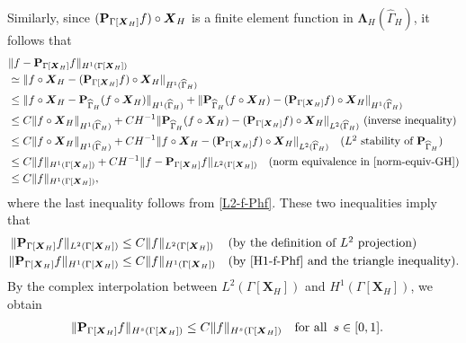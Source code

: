 \documentclass[11pt,reqno]{amsart}
\theoremstyle{definition}
\theoremstyle{plain}
\numberwithin{theorem}{section}
\numberwithin{proposition}{section}
\numberwithin{lemma}{section}
\numberwithin{equation}{section}
\newcommand{\bs}[1]{\boldsymbol{#1}}
\renewcommand{\(}{\bigl(}
\renewcommand{\)}{\bigr)}
\begin{document}
Similarly, since $({\bf P}_{\Gamma[\bs X_H]} f)\circ {\bs X}_H$ is a finite element function in ${\bs\Lambda}_H(\widehat\Gamma_H)$, it follows that 
\begin{align}\label{H1-f-Phf}
&\|f - {\bf P}_{\Gamma[\bs X_H]} f\|_{H^1(\Gamma[\bs X_H])} \notag\\
&\simeq 
\|f\circ{\bs X}_H - ({\bf P}_{\Gamma[\bs X_H]} f)\circ{\bs X}_H\|_{H^1(\widehat\Gamma_H)} \notag\\
&\le \|f \circ{\bs X}_H - {\bf P}_{\widehat\Gamma_H}(f\circ{\bs X}_H)\|_{H^1(\widehat\Gamma_H)} + 
\|{\bf P}_{\widehat\Gamma_H}(f\circ{\bs X}_H) - ({\bf P}_{\Gamma[\bs X_H]} f)\circ{\bs X}_H\|_{H^1(\widehat\Gamma_H)} \notag\\
&\le C\|f \circ{\bs X}_H \|_{H^1(\widehat\Gamma_H)} + CH^{-1}\|{\bf P}_{\widehat\Gamma_H}(f \circ{\bs X}_H) - ({\bf P}_{\Gamma[\bs X_H]} f)\circ {\bs X}_H\|_{L^2(\widehat\Gamma_H)} \,\,\mbox{(inverse inequality)}\notag\\
&\le C\|f \circ{\bs X}_H \|_{H^1(\widehat\Gamma_H)} + CH^{-1}\|f\circ{\bs X}_H - ({\bf P}_{\Gamma[{\bs X}_H]} f)\circ {\bs X}_H\|_{L^2(\widehat\Gamma_H)} \quad\mbox{($L^2$ stability of ${\bf P}_{\widehat\Gamma_H}$)} \notag\\
&\le C\|f\|_{H^1(\Gamma[{\bs X}_H])} + CH^{-1}\|f - {\bf P}_{\Gamma[\bs X_H]} f\|_{L^2(\Gamma[{\bs X}_H])} \quad\mbox{(norm equivalence in \eqref{norm-equiv-GH})} \notag\\
&\le C \|f\|_{H^1(\Gamma[\bs X_H])} ,
\end{align}
where the last inequality follows from \eqref{L2-f-Phf}. These two inequalities imply that 
\begin{align*}
\|{\bf P}_{\Gamma[\bs X_H]} f\|_{L^2(\Gamma[\bs X_H])}
&\le C\|f\|_{L^2(\Gamma[\bs X_H])} &&\mbox{(by the definition of $L^2$ projection)}\\
\|{\bf P}_{\Gamma[\bs X_H]} f\|_{H^1(\Gamma[\bs X_H])}
&\le C\|f\|_{H^1(\Gamma[\bs X_H])} &&\mbox{(by \eqref{H1-f-Phf} and the triangle inequality)}.
\end{align*}
By the complex interpolation between $L^2(\Gamma[\bs X_H])$ and $H^1(\Gamma[\bs X_H])$, we obtain 
\begin{align}\label{Hs-Phf}
\|{\bf P}_{\Gamma[\bs X_H]} f\|_{H^s(\Gamma[\bs X_H])}
&\le C\|f\|_{H^s(\Gamma[\bs X_H])} \quad\mbox{for all}\,\,\,s\in[0,1].
\end{align}
\end{document}
